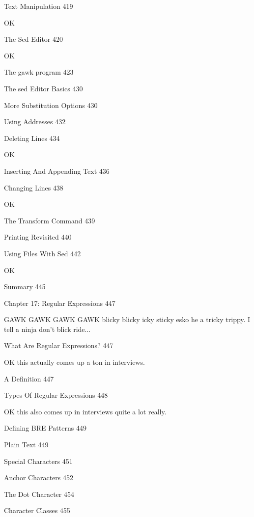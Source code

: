 Text Manipulation 419

OK

The Sed Editor 420

OK

The gawk program 423



The sed Editor Basics 430



More Substitution Options 430



Using Addresses 432



Deleting Lines 434

OK

Inserting And Appending Text 436



Changing Lines 438

OK

The Transform Command 439



Printing Revisited 440



Using Files With Sed 442

OK

Summary 445



Chapter 17: Regular Expressions 447

GAWK GAWK GAWK GAWK blicky blicky icky sticky esko he a tricky trippy. I tell a ninja don't blick ride...

What Are Regular Expressions? 447

OK this actually comes up a ton in interviews.

A Definition 447



Types Of Regular Expressions 448

OK this also comes up in interviews quite a lot really.

Defining BRE Patterns 449



Plain Text 449



Special Characters 451



Anchor Characters 452



The Dot Character 454



Character Classes 455



